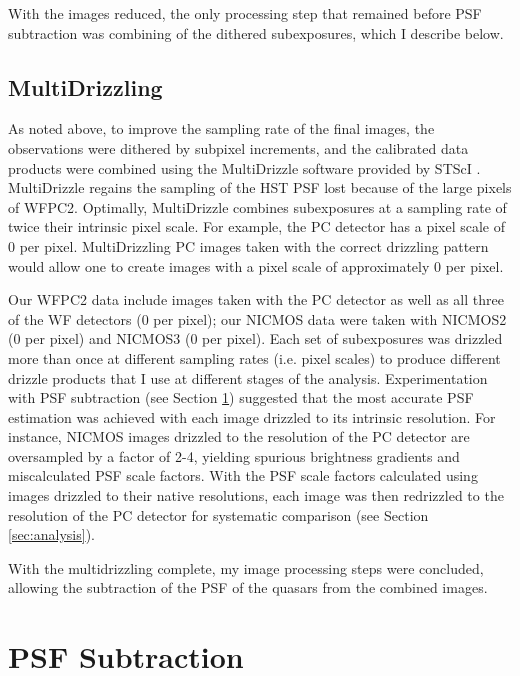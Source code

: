 With the images reduced, the only processing step that remained before PSF subtraction was combining of the dithered subexposures, which I describe below.


\subsection{MultiDrizzling}
\label{sec:drizzling}

As noted above, to improve the sampling rate of the final images, the observations were dithered by subpixel increments, and the calibrated data products were combined using the MultiDrizzle software provided by STScI \citep{FruchterDrizzle,KoekemoerMultidrizzle}. MultiDrizzle regains the sampling of the HST PSF lost because of the large pixels of WFPC2. Optimally, MultiDrizzle combines subexposures at a sampling rate of twice their intrinsic pixel scale. For example, the PC detector has a pixel scale of 0 per pixel. MultiDrizzling PC images taken with the correct drizzling pattern would allow one to create images with a pixel scale of approximately 0 per pixel.

Our WFPC2 data include images taken with the PC detector as well as all three of the WF detectors (0 per pixel); our NICMOS data were taken with NICMOS2 (0 per pixel) and NICMOS3 (0 per pixel). Each set of subexposures was drizzled more than once at different sampling rates (i.e. pixel scales) to produce different drizzle products that I use at different stages of the analysis. Experimentation with PSF subtraction (see Section \ref{sec:psf}) suggested that the most accurate PSF estimation was achieved with each image drizzled to its intrinsic resolution.  For instance, NICMOS images drizzled to the resolution of the PC detector are oversampled by a factor of 2-4, yielding spurious brightness gradients and miscalculated PSF scale factors.  With the PSF scale factors calculated using images drizzled to their native resolutions, each image was then redrizzled to the resolution of the PC detector for systematic comparison (see Section \ref{sec:analysis}).

With the multidrizzling complete, my image processing steps were concluded, allowing the subtraction of the PSF of the quasars from the combined images.


\section{PSF Subtraction}
\label{sec:psf}

